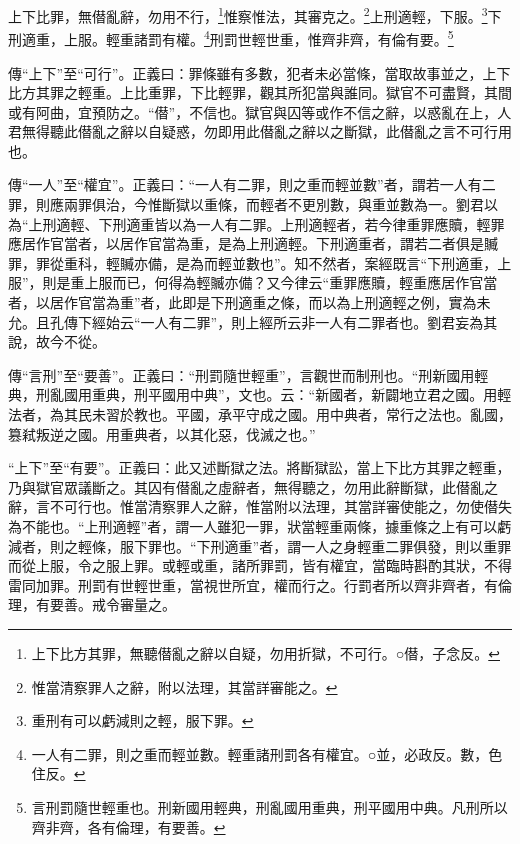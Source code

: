上下比罪，無僣亂辭，勿用不行，\footnote{上下比方其罪，無聽僣亂之辭以自疑，勿用折獄，不可行。○僣，子念反。}惟察惟法，其審克之。\footnote{惟當清察罪人之辭，附以法理，其當詳審能之。}上刑適輕，下服。\footnote{重刑有可以虧減則之輕，服下罪。}下刑適重，上服。輕重諸罰有權。\footnote{一人有二罪，則之重而輕並數。輕重諸刑罰各有權宜。○並，必政反。數，色住反。}刑罰世輕世重，惟齊非齊，有倫有要。\footnote{言刑罰隨世輕重也。刑新國用輕典，刑亂國用重典，刑平國用中典。凡刑所以齊非齊，各有倫理，有要善。}


{\noindent\zhuan{}\fzbyks 傳“上下”至“可行”。正義曰：罪條雖有多數，犯者未必當條，當取故事並之，上下比方其罪之輕重。上比重罪，下比輕罪，觀其所犯當與誰同。獄官不可盡賢，其間或有阿曲，宜預防之。“僣”，不信也。獄官與囚等或作不信之辭，以惑亂在上，人君無得聽此僣亂之辭以自疑惑，勿即用此僣亂之辭以之斷獄，此僣亂之言不可行用也。 \par}

{\noindent\zhuan{}\fzbyks 傳“一人”至“權宜”。正義曰：“一人有二罪，則之重而輕並數”者，謂若一人有二罪，則應兩罪俱治，今惟斷獄以重條，而輕者不更別數，與重並數為一。劉君以為“上刑適輕、下刑適重皆以為一人有二罪。上刑適輕者，若今律重罪應贖，輕罪應居作官當者，以居作官當為重，是為上刑適輕。下刑適重者，謂若二者俱是贓罪，罪從重科，輕贓亦備，是為而輕並數也”。知不然者，案經既言“下刑適重，上服”，則是重上服而已，何得為輕贓亦備？又今律云“重罪應贖，輕重應居作官當者，以居作官當為重”者，此即是下刑適重之條，而以為上刑適輕之例，實為未允。且孔傳下經始云“一人有二罪”，則上經所云非一人有二罪者也。劉君妄為其說，故今不從。 \par}

{\noindent\zhuan{}\fzbyks 傳“言刑”至“要善”。正義曰：“刑罰隨世輕重”，言觀世而制刑也。“刑新國用輕典，刑亂國用重典，刑平國用中典”，文也。云：“新國者，新闢地立君之國。用輕法者，為其民未習於教也。平國，承平守成之國。用中典者，常行之法也。亂國，篡弒叛逆之國。用重典者，以其化惡，伐滅之也。” \par}

{\noindent\shu{}\fzkt “上下”至“有要”。正義曰：此又述斷獄之法。將斷獄訟，當上下比方其罪之輕重，乃與獄官眾議斷之。其囚有僣亂之虛辭者，無得聽之，勿用此辭斷獄，此僣亂之辭，言不可行也。惟當清察罪人之辭，惟當附以法理，其當詳審使能之，勿使僣失為不能也。“上刑適輕”者，謂一人雖犯一罪，狀當輕重兩條，據重條之上有可以虧減者，則之輕條，服下罪也。“下刑適重”者，謂一人之身輕重二罪俱發，則以重罪而從上服，令之服上罪。或輕或重，諸所罪罰，皆有權宜，當臨時斟酌其狀，不得雷同加罪。刑罰有世輕世重，當視世所宜，權而行之。行罰者所以齊非齊者，有倫理，有要善。戒令審量之。 \par}

